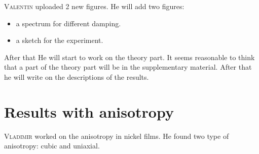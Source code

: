 \documentclass[12pt,a4paper]{article}
\newcommand{\valentin}{\textsc{Valentin} }
\newcommand{\vladimir}{\textsc{Vladimir} }
\begin{document}
\valentin uploaded 2 new figures.
He will add two figures:
\begin{itemize}
    \item a spectrum for different damping.
    \item a sketch for the experiment.
\end{itemize}
After that He will start to work on the theory part.
It seems reasonable to think that a part of the theory part will be in the supplementary material.
After that he will write on the descriptions of the results.

\section{Results with anisotropy}

\vladimir worked on the anisotropy in nickel films.
He found two type of anisotropy: cubic and uniaxial.
\end{document}
